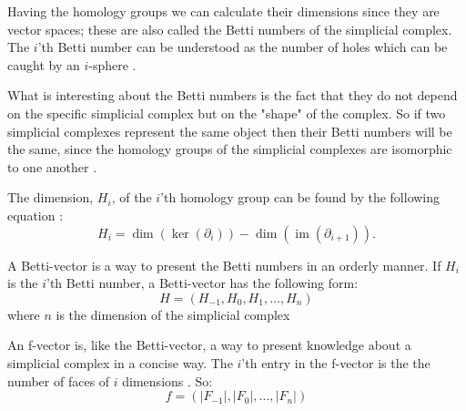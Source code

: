 \documentclass[11pt,a4paper,twoside]{report}
\DeclareMathOperator{\im}{im}
\begin{document}
Having the homology groups we can calculate their dimensions since they are vector spaces; these are also called the Betti numbers of the simplicial complex. The $i$'th Betti number can be understood as the number of holes which can be caught by an $i$-sphere \cite{wikiBetti}.

What is interesting about the Betti numbers is the fact that they do not depend on the  specific simplicial complex but on the "shape" of the complex. So if two simplicial complexes represent the same object then their Betti numbers will be the same, since the homology groups of the simplicial complexes are isomorphic to one another \cite[p. 70]{Edelsbrunner}. 

The dimension, $H_i$, of the $i$'th homology group can be found by the following equation \cite[p.2]{Allgaier}:
\begin{equation*}
H_i = \dim(\ker(\partial_i))-\dim(\im(\partial_{i+1})).
\end{equation*}

A Betti-vector is a way to present the Betti numbers in an orderly manner. If $H_i$ is the $i$'th Betti number, a Betti-vector has the following form:
\begin{equation*}
H = (H_{-1},H_0,H_1,\dots,H_n)
\end{equation*}
where $n$ is the dimension of the simplicial complex

An f-vector is, like the Betti-vector, a way to present knowledge about a simplicial complex in a concise way. The $i$'th entry in the f-vector is the the number of faces of $i$ dimensions \cite[p.15]{Jonsson}. So:
\begin{equation*}
f = (|F_{-1}|,|F_0|,\dots,|F_n|)
\end{equation*}
\end{document}

